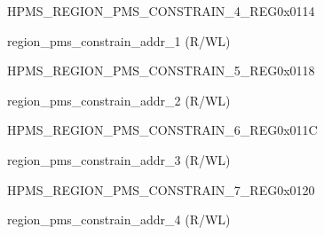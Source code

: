 \begin{register}{H}{PMS\_REGION\_PMS\_CONSTRAIN\_4\_REG}{0x0114}\label{regdesc:PMSREGIONPMSCONSTRAIN4REG}
%
%
\regnewline%
\begin{regdesc}\begin{reglist}
\label{fielddesc:PMSREGIONPMSCONSTRAINADDR1}\item [PMS\_REGION\_PMS\_CONSTRAIN\_ADDR\_1] region\_pms\_constrain\_addr\_1 (R/WL)
\end{reglist}\end{regdesc}
\end{register}


\begin{register}{H}{PMS\_REGION\_PMS\_CONSTRAIN\_5\_REG}{0x0118}\label{regdesc:PMSREGIONPMSCONSTRAIN5REG}
%
%
\regnewline%
\begin{regdesc}\begin{reglist}
\label{fielddesc:PMSREGIONPMSCONSTRAINADDR2}\item [PMS\_REGION\_PMS\_CONSTRAIN\_ADDR\_2] region\_pms\_constrain\_addr\_2 (R/WL)
\end{reglist}\end{regdesc}
\end{register}


\begin{register}{H}{PMS\_REGION\_PMS\_CONSTRAIN\_6\_REG}{0x011C}\label{regdesc:PMSREGIONPMSCONSTRAIN6REG}
%
%
\regnewline%
\begin{regdesc}\begin{reglist}
\label{fielddesc:PMSREGIONPMSCONSTRAINADDR3}\item [PMS\_REGION\_PMS\_CONSTRAIN\_ADDR\_3] region\_pms\_constrain\_addr\_3 (R/WL)
\end{reglist}\end{regdesc}
\end{register}


\begin{register}{H}{PMS\_REGION\_PMS\_CONSTRAIN\_7\_REG}{0x0120}\label{regdesc:PMSREGIONPMSCONSTRAIN7REG}
%
%
\regnewline%
\begin{regdesc}\begin{reglist}
\label{fielddesc:PMSREGIONPMSCONSTRAINADDR4}\item [PMS\_REGION\_PMS\_CONSTRAIN\_ADDR\_4] region\_pms\_constrain\_addr\_4 (R/WL)
\end{reglist}\end{regdesc}
\end{register}


